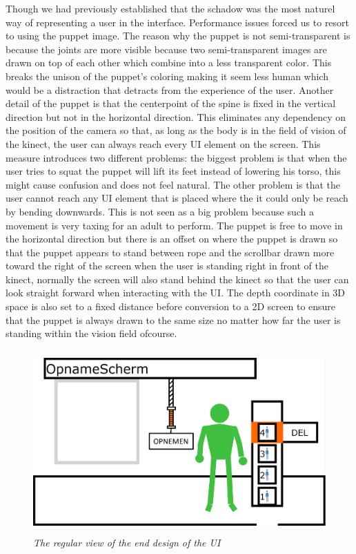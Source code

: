 Though we had previously established that the schadow was the most naturel way of representing a user in the interface. Performance issues forced us to resort to using the puppet image. The reason why the puppet is not semi-transparent is because the joints are more visible because two semi-transparent images are drawn on top of each other which combine into a less transparent color. This breaks the unison of the puppet's coloring making it seem less human which would be a distraction that detracts from the experience of the user. Another detail of the puppet is that the centerpoint of the spine is fixed in the vertical direction but not in the horizontal direction. This eliminates any dependency on the position of the camera so that, as long as the body is in the field of vision of the kinect, the user can always reach every UI element on the screen. This measure introduces two different problems: the biggest problem is that when the user tries to squat the puppet will lift its feet instead of lowering his torso, this might cause confusion and does not feel natural. The other problem is that the user cannot reach any UI element that is placed where the it could only be reach by bending downwards. This is not seen as a big problem because such a movement is very taxing for an adult to perform. The puppet is free to move in the horizontal direction but there is an offset on where the puppet is drawn so that the puppet appears to stand between rope and the scrollbar drawn more toward the right of the screen when the user is standing right in front of the kinect, normally the screen will also stand behind the kinect so that the user can look straight forward when interacting with the UI. The depth coordinate in 3D space is also set to a fixed distance before conversion to a 2D screen to ensure that the puppet is always drawn to the same size no matter how far the user is standing within the vision field ofcourse.

\begin{figure}[H]
	\begin{center}
		\includegraphics[width=12.5cm, height=7cm]{figures/1_screen_with_user.png}
		\caption{\emph{The regular view of the end design of the UI}}
		\label{The regular view of the end desing of the UI}
	\end{center}
\end{figure}


